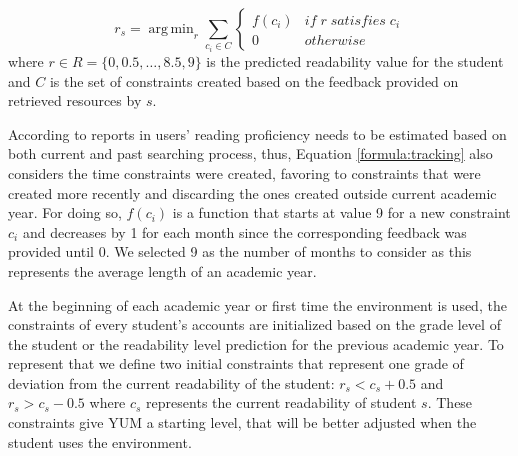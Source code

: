 \documentclass{sig-alternate-05-2015}
\DeclareMathOperator*{\argminA}{arg\,min} %
\begin{document}
\begin{equation}
r_s = \argminA_r  \sum_ {c_{i} \in C} \begin{cases}f(c_{i}) & if \; r \;  satisfies \; c_{i}\\0 & otherwise\end{cases}  
\label{formula:tracking}
\end{equation}
\noindent
where $r \in R=\{0,0.5,\dotsc ,8.5,9\}$ is the predicted readability value for the student and $C$ is the set of constraints created based on the feedback provided on retrieved resources by $s$.

 According to reports in \cite{Col11} users' reading proficiency needs to be estimated based on both current and past searching process, thus, Equation \ref{formula:tracking} also considers the time constraints were created, favoring to constraints that were created more recently and discarding the ones created outside current academic year. For doing so, $f(c_i)$ is a function  that starts at value 9 for a new constraint $c_i$ and decreases by 1 for each month since the corresponding feedback was provided until 0. We selected 9 as the number of months to consider as this represents the average length of an academic year.%

At the beginning of each academic year or first time the environment is used, the constraints of every student's accounts are initialized  based on the grade level of the student or the readability level prediction  for the previous academic year. To represent that we define two initial constraints that represent one grade of deviation from the current readability of the student: $r_s < c_s+0.5$ and $r_s > c_s -0.5$ where $c_s$ represents the current readability of student $s$. These constraints give YUM a starting level, that will be better adjusted when the student uses the environment. 
\end{document}
